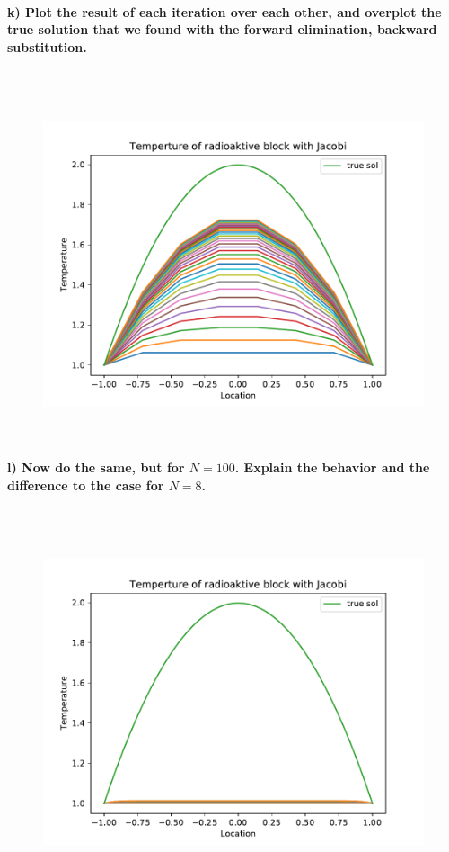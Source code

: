 \paragraph{
    k) Plot the result of each iteration over each other, and overplot
    the true solution that we found with the forward elimination,
    backward substitution.
} \ \\
    \\
    \begin{figure}[h!]
        \centering
        \includegraphics[width=\textwidth]{../figures/Aufg1k.pdf}
    \end{figure} \ \\ 

\newpage
\paragraph{
    l) Now do the same, but for $N=100$. Explain the behavior and the
    difference to the case for $N=8$.
} \ \\
    \\
    \begin{figure}[h!]
        \centering
        \includegraphics[width=\textwidth]{../figures/Aufg1l.pdf}
    \end{figure} \ \\ 
    
